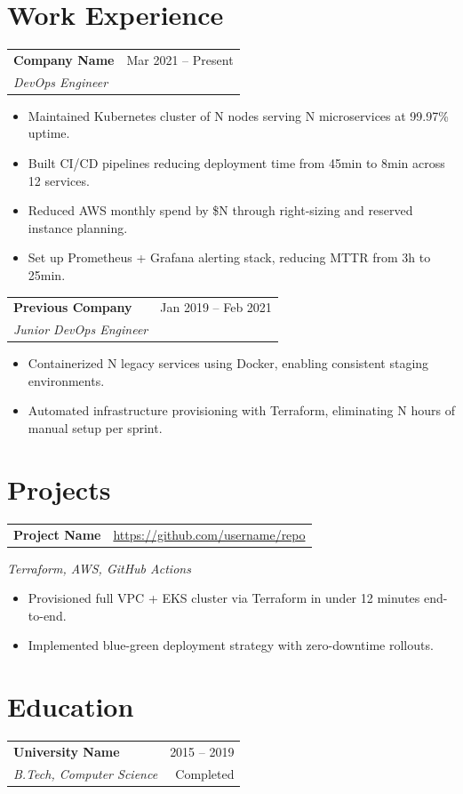 \documentclass[10pt, a4paper]{article}
\makeatletter
\newcommand{\workentry}[4]{%
  \noindent
  \begin{tabularx}{\linewidth}{@{}X r@{}}
    \textbf{#1} & \textcolor{subtle}{\small #3} \\
    \textit{\small #2} &
  \end{tabularx}
  \vspace{1pt}
  #4
  \vspace{6pt}
}
\newcommand{\eduentry}[4]{%
  \noindent
  \begin{tabularx}{\linewidth}{@{}X r@{}}
    \textbf{#1} & \textcolor{subtle}{\small #4} \\
    \textit{\small #2} & \textcolor{subtle}{\small #3}
  \end{tabularx}
  \vspace{4pt}
}
\newcommand{\projectentry}[4]{%
  \noindent
  \begin{tabularx}{\linewidth}{@{}X r@{}}
    \textbf{#1} & \href{#3}{\textcolor{subtle}{\small #3}}
  \end{tabularx}
  \vspace{1pt}
  \textcolor{subtle}{\small \textit{#2}}
  \vspace{1pt}
  #4
  \vspace{6pt}
}
\makeatother
\begin{document}
\section{Work Experience}
\workentry{Company Name}{DevOps Engineer}{Mar 2021 -- Present}{%
  \begin{itemize}
    \item Maintained Kubernetes cluster of N nodes serving N microservices at 99.97\% uptime.
    \item Built CI/CD pipelines reducing deployment time from 45min to 8min across 12 services.
    \item Reduced AWS monthly spend by \$N through right-sizing and reserved instance planning.
    \item Set up Prometheus + Grafana alerting stack, reducing MTTR from 3h to 25min.
  \end{itemize}
}

\workentry{Previous Company}{Junior DevOps Engineer}{Jan 2019 -- Feb 2021}{%
  \begin{itemize}
    \item Containerized N legacy services using Docker, enabling consistent staging environments.
    \item Automated infrastructure provisioning with Terraform, eliminating N hours of manual setup per sprint.
  \end{itemize}
}

\section{Projects}
\projectentry{Project Name}{Terraform, AWS, GitHub Actions}{https://github.com/username/repo}{%
  \begin{itemize}
    \item Provisioned full VPC + EKS cluster via Terraform in under 12 minutes end-to-end.
    \item Implemented blue-green deployment strategy with zero-downtime rollouts.
  \end{itemize}
}

\section{Education}
\eduentry{University Name}{B.Tech, Computer Science}{Completed}{2015 -- 2019}

\end{document}
